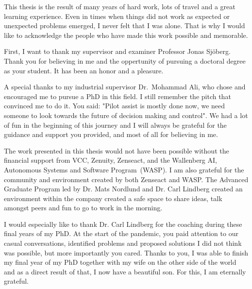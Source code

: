 


This thesis is the result of many years of hard work, lots of travel and a great learning experience. Even in times when things did not work as expected or unexpected problems emerged, I never felt that I was alone. That is why I would like to acknowledge the people who have made this work possible and memorable. 

First, I want to thank my supervisor and examiner Professor Jonas Sj\"oberg. 
Thank you for believing in me and the oppertunity of pursuing a doctoral degree as your student. It has been an honor and a pleasure.

A special thanks to my industrial supervisor Dr.~Mohammad Ali, who chose and encouraged me to pursue a PhD in this field. I still remember the pitch that convinced me to do it. You said: "Pilot assist is mostly done now, we need someone to look towards the future of decision making and control". We had a lot of fun in the beginning of this journey and I will always be grateful for the guidance and support you provided, and most of all for believing in me. 

The work presented in this thesis would not have been possible without the financial support from VCC, Zenuity, Zenseact, and the Wallenberg AI, Autonomous Systems and Software Program~(WASP). I am also grateful for the community and environment created by both Zenseact and WASP. The Advanced Graduate Program led by Dr. Mats Nordlund and Dr. Carl Lindberg created an environment within the company created a safe space to share ideas, talk amongst peers and fun to go to work in the morning. 

I would especially like to thank Dr. Carl Lindberg for the coaching during these final years of my PhD. At the start of the pandemic, you paid attention to our casual conversations, identified problems and proposed solutions I did not think was possible, but more importantly you cared. Thanks to you, I was able to finish my final year of my PhD together with my wife on the other side of the world and as a direct result of that, I now have a beautiful son. For this, I am eternally grateful. 
 
